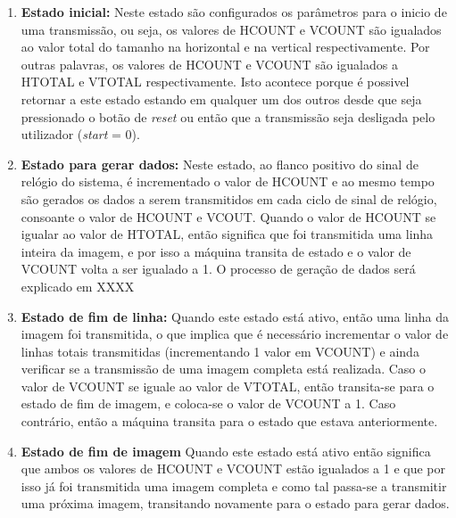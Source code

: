 \begin{enumerate}
	\item \textbf{Estado inicial:} Neste estado são configurados os parâmetros para o inicio de uma transmissão, ou seja, os valores de HCOUNT e VCOUNT são igualados ao valor total do tamanho na horizontal e na vertical respectivamente. Por outras palavras, os valores de HCOUNT e VCOUNT são igualados a HTOTAL e VTOTAL respectivamente. Isto acontece porque é possivel retornar a este estado estando em qualquer um dos outros desde que seja pressionado o botão  de \textit{reset} ou então que a transmissão seja desligada pelo utilizador (\textit{start} = 0).
	\item \textbf{Estado para gerar dados:} Neste estado, ao flanco positivo do sinal de relógio do sistema, é incrementado o valor de HCOUNT e ao mesmo tempo são gerados os dados a serem transmitidos em cada ciclo de sinal de relógio, consoante o valor de HCOUNT e VCOUT. Quando o valor de HCOUNT se igualar ao valor de HTOTAL, então significa que foi transmitida uma linha inteira da imagem, e por isso a máquina transita de estado e o valor de VCOUNT volta a ser igualado a 1. O processo de geração de dados será explicado em XXXX
	\item \textbf{Estado de fim de linha:} Quando este estado está ativo, então uma linha da imagem foi transmitida, o que implica que é necessário incrementar o valor de linhas totais transmitidas (incrementando 1 valor em VCOUNT) e ainda verificar se a transmissão de uma imagem completa está realizada. Caso o valor de VCOUNT se iguale ao valor de VTOTAL, então transita-se para o estado de fim de imagem, e coloca-se o valor de VCOUNT a 1. Caso contrário, então a máquina transita para o estado que estava anteriormente.
	\item \textbf{Estado de fim de imagem} Quando este estado está ativo então significa que ambos os valores de HCOUNT e VCOUNT estão igualados a 1 e que por isso já foi transmitida uma imagem completa e como tal passa-se a transmitir uma próxima imagem, transitando novamente para o estado para gerar dados.
\end{enumerate}

